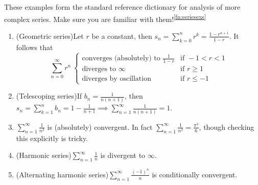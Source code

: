 
\goodbreak


\begin{examples}{}{}
These examples form the standard reference dictionary for analysis of more complex series. Make sure you are familiar with them!\textsuperscript{\ref{fn:seriesexs}}\vspace{-10pt}
\addtocounter{footnote}{1}%
\begin{enumerate}\itemsep0pt
  \item (Geometric series)\quad Let $r$ be a constant, then $s_n=\sum\limits_{k=0}^n r^k=\frac{1-r^{n+1}}{1-r}$.
  It follows that
  \[\sum_{n=0}^\infty r^n\  \begin{cases}
  \text{converges (absolutely) to }\frac 1{1-r}&\text{if }-1<r<1\\
  \text{diverges to }\infty&\text{if }r\ge 1\\
  \text{diverges by oscillation}&\text{if }r\le -1
  \end{cases}\]
  \item (Telescoping series)\quad If $b_n=\frac 1{n(n+1)}$, then $s_n=\sum
 \limits_{k=1}^nb_n=1-\frac 1{n+1}\implies \sum\limits_{n=1}^\infty\frac 1{n(n+1)}=1$.
  \item $\sum\limits_{n=1}^\infty \frac 1{n^2}$ is (absolutely) convergent. In fact $\sum\limits_{n=1}^\infty\frac 1{n^2}=\frac{\pi^2}6$, though checking this explicitly is tricky.
  \item (Harmonic series)\quad $\sum\limits_{n=1}^\infty\frac 1n$ is divergent to $\infty$.
	\item (Alternating harmonic series)\quad $\sum\limits_{n=1}^\infty \frac{(-1)^n}n$ is conditionally convergent.
\end{enumerate}
\end{examples}


